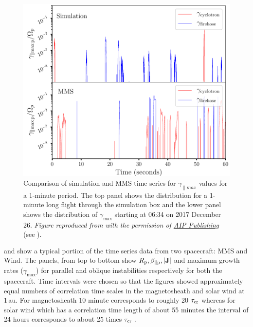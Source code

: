             \begin{figure}
                \begin{center}
                    \includegraphics[width=1.\textwidth]{figures/chap5/SpaceCraft_simulation_mms.pdf}
                    \caption[Spacecraft and simulation comparison of $\gamma$ time
                            series]{Comparison of simulation and MMS time series for
                            $\gamma_{\parallel max}$ values for a 1-minute period. The top panel
                            shows the distribution for a 1-minute long flight through the simulation
                            box and the lower panel shows the distribution of $\gamma_\mathrm{max}$
                            starting at 06:34 on 2017 December 26. \textit{Figure reproduced from
                            \citet{Qudsi2020a} with the permission of
                            \href{https://publishing.aip.org/}{AIP Publishing}} (see
                            ).}
                    \label{fig:spcsim}
                \end{center}
            \end{figure}

             and  show a typical portion of the time series data
            from two spacecraft: MMS and Wind. The panels, from top to bottom show $R_{\rm p},
            \beta_{\parallel \rm p}, |\mathbf{J}|$ and maximum growth rates ($\gamma_\mathrm{max}$)
            for parallel and oblique instabilities respectively for both the spacecraft. Time
            intervals were chosen so that the figures showed approximately equal numbers of
            correlation time scales in the magnetosheath and solar wind at 1\,au. For magnetosheath
            10 minute corresponds to roughly 20 $\tau_{\rm cr}$ \citep{Le1993,Gutynska2008} whereas
            for solar wind which has a correlation time length of about 55 minutes the interval of
            24 hours corresponds to about 25 times $\tau_{\rm cr}$ \citep{Matthaeus1982,Wicks2010}.

